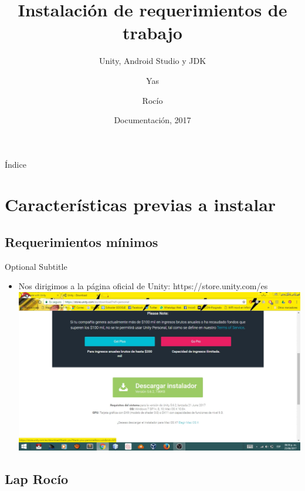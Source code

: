 \documentclass{beamer}
\title{Instalación de requerimientos de trabajo}
\subtitle{Unity, Android Studio y JDK}
\author{Yas\inst{1} \and Rocío\inst{2}}
\institute[Universities of Somewhere and Elsewhere] %
{
  \inst{1}%
  Instituto Politécnico Nacional
  \and
  \inst{2}%
  Escuela Superior de Cómputo}
\date{Documentación, 2017}
\begin{document}
\begin{frame}
  \titlepage
\end{frame}

\begin{frame}{Índice}
  \tableofcontents
\end{frame}

\section{Características previas a instalar}

\subsection{Requerimientos mínimos}

\begin{frame}{01}{Optional Subtitle}
  \begin{itemize}
  \item {
    Nos dirigimos a la página oficial de Unity:
    https://store.unity.com/es
  }
  \includegraphics[width=\linewidth]{image/IU01}
  \end{itemize}
\end{frame}

\subsection{Lap Rocío}
\end{document}
